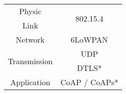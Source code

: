 \begin{tabular}{|c|c|}
\hline
Physic                        & \multirow{2}{*}{802.15.4} \\ \cline{1-1}
Link                          &                           \\ \hline
Network                       & 6LoWPAN                   \\ \hline
\multirow{2}{*}{Transmission} & UDP                       \\ \cline{2-2} 
                              & DTLS*                     \\ \hline
Application                   & CoAP / CoAPs*             \\ \hline
\end{tabular}
